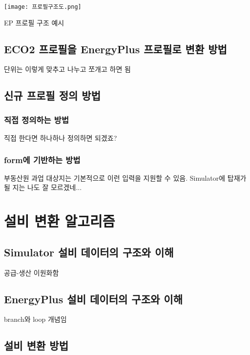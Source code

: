 \begin{defaultfigure}
  \texttt{[image: 프로필구조도.png]}
  \caption{EP 프로필 구조 예시}
  \label{fig:ep_profile_structure}
\end{defaultfigure}

\subsection{ECO2 프로필을 EnergyPlus 프로필로 변환 방법}
단위는 이렇게 맞추고 나누고 쪼개고 하면 됨

\subsection{신규 프로필 정의 방법}
\subsubsection{직접 정의하는 방법}
직접 한다면 하나하나 정의하면 되겠죠?

\subsubsection{form에 기반하는 방법}
부동산원 과업 대상지는 기본적으로 이런 입력을 지원할 수 있음.
Simulator에 탑재가 될 지는 나도 잘 모르겠네...


\section{설비 변환 알고리즘}
\subsection{Simulator 설비 데이터의 구조와 이해}
공급-생산 이원화함

\subsection{EnergyPlus 설비 데이터의 구조와 이해}
branch와 loop 개념임

\subsection{설비 변환 방법}
